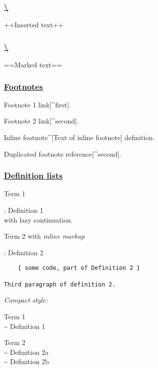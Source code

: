 \documentclass[]{article}
\begin{document}
\subsubsection{\texorpdfstring{\href{https://github.com/markdown-it/markdown-it-ins}{\textbackslash{}}}{\textbackslash{}}}\label{section}

++Inserted text++

\subsubsection{\texorpdfstring{\href{https://github.com/markdown-it/markdown-it-mark}{\textbackslash{}}}{\textbackslash{}}}\label{section-1}

==Marked text==

\subsubsection{\texorpdfstring{\href{https://github.com/markdown-it/markdown-it-footnote}{Footnotes}}{Footnotes}}\label{footnotes}

Footnote 1 link{[}\^{}first{]}.

Footnote 2 link{[}\^{}second{]}.

Inline footnote\^{}{[}Text of inline footnote{]} definition.

Duplicated footnote reference{[}\^{}second{]}.

\subsubsection{\texorpdfstring{\href{https://github.com/markdown-it/markdown-it-deflist}{Definition
lists}}{Definition lists}}\label{definition-lists}

Term 1

: Definition 1\\
with lazy continuation.

Term 2 with \emph{inline markup}

: Definition 2

\begin{verbatim}
    { some code, part of Definition 2 }

Third paragraph of definition 2.
\end{verbatim}

\emph{Compact style:}

Term 1\\
\textasciitilde{} Definition 1

Term 2\\
\textasciitilde{} Definition 2a\\
\textasciitilde{} Definition 2b
\end{document}
